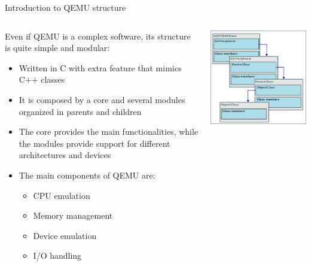 \documentclass{beamer}
\begin{document}
\begin{frame}[fragile]{Introduction to QEMU structure}
    \begin{columns}
    \begin{column}{0.6\textwidth}
        Even if QEMU is a complex software, its structure is quite simple and modular:
        \begin{itemize}
            \item Written in C with extra feature that mimics C++ classes
            \item It is composed by a core and several modules organized in parents and children
            \item The core provides the main functionalities, while the modules provide support for different architectures and devices
            \item The main components of QEMU are:
            \begin{itemize}
                \item CPU emulation
                \item Memory management
                \item Device emulation
                \item I/O handling
            \end{itemize}
        \end{itemize}
    \end{column}
    \begin{column}{0.4\textwidth}
            \includegraphics[width=\textwidth]{assets/qemu_structure.png}
    \end{column}
    \end{columns}
\end{frame}
\end{document}
